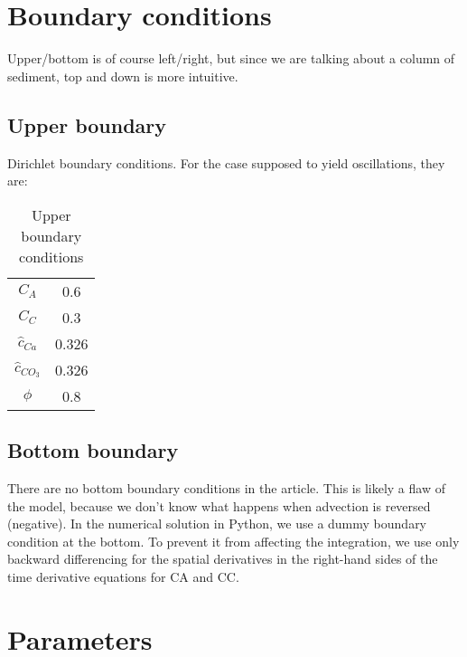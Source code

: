 \documentclass[10pt, letterpaper]{article}
\begin{document}
\section{Boundary conditions}
Upper/bottom is of course left/right, but since we are talking about a column of sediment, top and down is more intuitive.

\subsection{Upper boundary}
Dirichlet boundary conditions. For the case supposed to yield oscillations, they are:

\begin{table}
    \centering
    \begin{tabular}{cc}
         $C_A$& 0.6\\
         $C_C$& 0.3\\
         $\hat{c}_{Ca}$& 0.326\\
         $\hat{c}_{CO_3}$& 0.326\\
         $\phi$& 0.8\\
    \end{tabular}
    \caption{Upper boundary conditions}
\end{table}
\subsection{Bottom boundary}
There are no bottom boundary conditions in the article. This is likely a flaw of the model, because we don't know what happens when advection is reversed (negative).
In the numerical solution in Python, we use a dummy boundary condition at the bottom. To prevent it from affecting the integration, we use only backward differencing for the spatial derivatives in the right-hand sides of the time derivative equations for CA and CC.

\section{Parameters}
\end{document}
